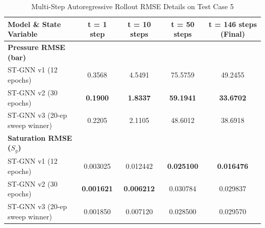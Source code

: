 \begin{table}[h]
\centering
\caption{Multi-Step Autoregressive Rollout RMSE Details on Test Case 5}
\label{tab:rollout_metrics}
\begin{tabular}{lcccc}
\toprule
\textbf{Model \& State Variable} & \textbf{t = 1 step} & \textbf{t = 10 steps} & \textbf{t = 50 steps} & \textbf{t = 146 steps (Final)} \\
\midrule
\textbf{Pressure RMSE (bar)} \\
ST-GNN v1 (12 epochs) & 0.3568 & 4.5491 & 75.5759 & 49.2455 \\
ST-GNN v2 (30 epochs) & \textbf{0.1900} & \textbf{1.8337} & \textbf{59.1941} & \textbf{33.6702} \\
ST-GNN v3 (20-ep sweep winner) & 0.2205 & 2.1105 & 48.6012 & 38.6918 \\
\midrule
\textbf{Saturation RMSE ($S_g$)} \\
ST-GNN v1 (12 epochs) & 0.003025 & 0.012442 & \textbf{0.025100} & \textbf{0.016476} \\
ST-GNN v2 (30 epochs) & \textbf{0.001621} & \textbf{0.006212} & 0.030784 & 0.029837 \\
ST-GNN v3 (20-ep sweep winner) & 0.001850 & 0.007120 & 0.028500 & 0.029570 \\
\bottomrule
\end{tabular}
\end{table}
